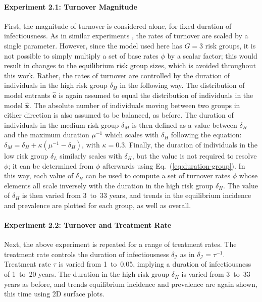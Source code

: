 \paragraph{Experiment 2.1: Turnover Magnitude}
First, the magnitude of turnover is considered alone,
for fixed duration of infectiousness.
As in similar experiments \citep{Zhang2012,Henry2015},
the rates of turnover are scaled by a single parameter.
However, since the model used here has $G = 3$ risk groups,
it is not possible to simply multiply a set of base rates $\phi$ by a scalar factor;
this would result in changes to the equilibrium risk group sizes,
which is avoided throughout this work.
Rather, the rates of turnover are controlled by
the duration of individuals in the high risk group $\delta_H$ in the following way.
The distribution of model entrants $\bm{\hat{e}}$ is again assumed to equal
the distribution of individuals in the model $\bm{\hat{x}}$.
The absolute number of individuals moving between two groups in either direction
is also assumed to be balanced, as before.
The duration of individuals in the medium risk group $\delta_M$
is then defined as a value between $\delta_H$ and the maximum duration $\mu^{-1}$
which scales with $\delta_H$ following the equation:
$\delta_M = \delta_H + \kappa \left(\mu^{-1} - \delta_H\right)$, with $\kappa = 0.3$.
Finally, the duration of individuals in the low risk group $\delta_L$
similarly scales with $\delta_H$,
but the value is not required to resolve $\phi$;
it can be determined from $\phi$ afterwards
using Eq.~(\ref{eq:duration-group}).
In this way, each value of $\delta_H$ can be used to compute a set of turnover rates $\phi$
whose elements all scale inversely with the duration in the high risk group $\delta_H$.
The value of $\delta_H$ is then varied from 3~to~33 years,
and trends in the equilibrium incidence and prevalence are plotted
for each group, as well as overall.
\par
\paragraph{Experiment 2.2: Turnover and Treatment Rate}
Next, the above experiment is repeated for a range of treatment rates.
The treatment rate controls the duration of infectiousness $\delta_{\mathcal{I}}$
as in $\delta_{\mathcal{I}} = \tau^{-1}$.
Treatment rate $\tau$ is varied from 1~to~0.05,
implying a duration of infectiousness of 1~to~20 years.
The duration in the high risk group $\delta_H$ is varied from 3~to~33 years as before,
and trends equilibrium incidence and prevalence are again shown,
this time using 2D surface plots.
